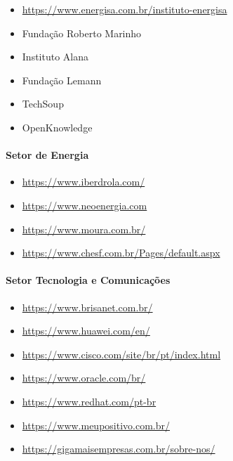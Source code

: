 \begin{itemize}
\item \href{https://www.energisa.com.br/instituto-energisa}{https://www.energisa.com.br/instituto-energisa}
\item Fundação Roberto Marinho
\item Instituto Alana
\item Fundação Lemann
\item TechSoup
\item OpenKnowledge
\end{itemize}

\paragraph{Setor de Energia}

\begin{itemize}
\item \href{https://www.iberdrola.com/}{https://www.iberdrola.com/}
\item \href{https://www.neoenergia.com}{https://www.neoenergia.com}
\item \href{https://www.moura.com.br/}{https://www.moura.com.br/}
\item \href{https://www.chesf.com.br/Pages/default.aspx}{https://www.chesf.com.br/Pages/default.aspx}
\end{itemize}

\paragraph{Setor Tecnologia e Comunicações}

\begin{itemize}
\item \href{https://www.brisanet.com.br/}{https://www.brisanet.com.br/}
\item \href{https://www.huawei.com/en/}{https://www.huawei.com/en/}
\item \href{https://www.cisco.com/site/br/pt/index.html}{https://www.cisco.com/site/br/pt/index.html}
\item \href{https://www.oracle.com/br/}{https://www.oracle.com/br/}
\item \href{https://www.redhat.com/pt-br}{https://www.redhat.com/pt-br}
\item \href{https://www.meupositivo.com.br/}{https://www.meupositivo.com.br/}
\item \href{https://gigamaisempresas.com.br/sobre-nos/}{https://gigamaisempresas.com.br/sobre-nos/}
\end{itemize}